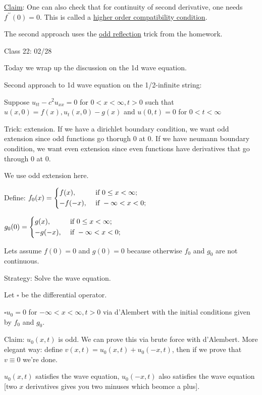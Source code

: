 \documentclass{article}
\theoremstyle{definition}
\begin{document}
\underline{Claim}: One can also check that for continuity of second derivative, one needs \(f^{\prime\prime} (0) = 0\). This is called a \underline{higher order compatibility condition}.

The second approach uses the \underline{odd reflection} trick from the homework.

\hrulefill

Class 22: 02/28

Today we wrap up the discussion on the 1d wave equation.

Second approach to 1d wave equation on the 1/2-infinite string:

Suppose \(u_{t t} - c^2 u_{x x} = 0\) for \(0 < x < \infty, t > 0\) such that \(u(x,0)=f(x), u_t(x,0)-g(x)\) and \(u(0,t)=0\) for \(0 < t < \infty\) 

Trick: extension. If we have a dirichlet boundary condition, we want odd extension since odd functions go thorugh 0 at 0. If we have neumann boundary condition, we want even extension since even functions have derivatives that go through 0 at 0.

We use odd extension here.

Define: \(f_0(x) = \begin{dcases}
    f(x), &\text{ if } 0 \leq x < \infty ;\\
    -f(-x), &\text{ if } - \infty < x < 0 ;
\end{dcases}\) 

\(g_0(0) = \begin{dcases}
    g(x), &\text{ if } 0 \leq x < \infty ;\\
    -g(-x), &\text{ if } - \infty < x < 0 ;
\end{dcases}\) 

Lets assume \(f(0)=0\) and \(g(0)=0\) because otherwise \(f_0\) and \(g_0\) are not continuous.

Strategy: Solve the wave equation.

Let \(\square\) be the differential operator.

\(\square u_0 = 0\) for \(-\infty < x < \infty , t > 0\) via d'Alembert with the initial conditions given by \(f_0\) and \(g_0\).

Claim: \(u_0(x,t)\) is odd. We can prove this via brute force with d'Alembert. More elegant way: define \(v(x,t)=u_0(x,t)+u_0(-x,t)\), then if we prove that \(v\equiv 0\) we're done.

\(u_0(x,t)\) satisfies the wave equation, \(u_0(-x,t)\) also satisfies the wave equation [two \(x\) derivatives gives you two minuses which beomce a plus].
\end{document}
